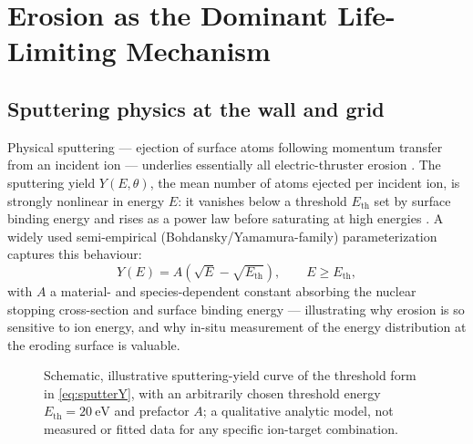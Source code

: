 \section{Erosion as the Dominant Life-Limiting Mechanism}
\label{sec:erosion}

\subsection{Sputtering physics at the wall and grid}

Physical sputtering — ejection of surface atoms following momentum transfer from an incident ion — underlies essentially all electric-thruster erosion \cite{ref0143}. The sputtering yield $Y(E,\theta)$, the mean number of atoms ejected per incident ion, is strongly nonlinear in energy $E$: it vanishes below a threshold $E_{\mathrm{th}}$ set by surface binding energy and rises as a power law before saturating at high energies \cite{ref0152}. A widely used semi-empirical (Bohdansky/Yamamura-family) parameterization captures this behaviour:
\begin{equation}
Y(E) = A\left(\sqrt{E} - \sqrt{E_{\mathrm{th}}}\right), \qquad E \geq E_{\mathrm{th}},
\label{eq:sputterY}
\end{equation}
with $A$ a material- and species-dependent constant absorbing the nuclear stopping cross-section and surface binding energy — illustrating why erosion is so sensitive to ion energy, and why in-situ measurement of the energy distribution at the eroding surface is valuable.

\begin{figure}[htbp]
\centering
{}
\caption{Schematic, illustrative sputtering-yield curve of the threshold form in \cref{eq:sputterY}, with an arbitrarily chosen threshold energy $E_{\mathrm{th}}=\SI{20}{\electronvolt}$ and prefactor $A$; a qualitative analytic model, not measured or fitted data for any specific ion-target combination.}
\label{fig:sputterY}
\end{figure}

